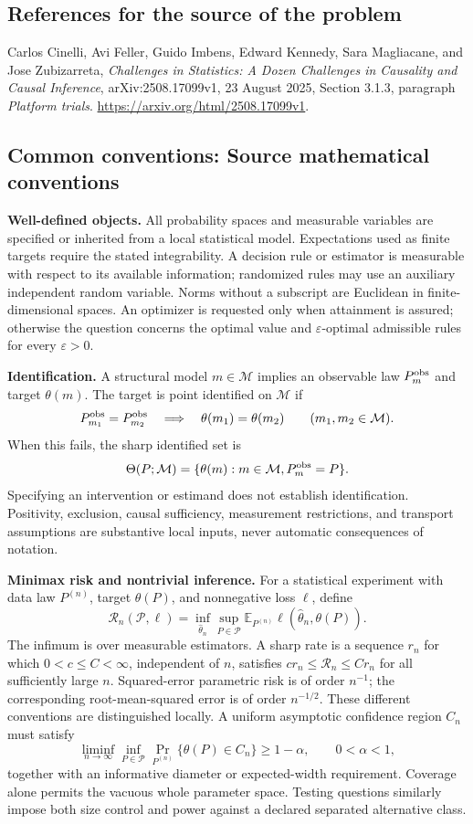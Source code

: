 \documentclass[11pt,a4paper]{article}
\newcommand{\E}{\mathbb E}
\begin{document}
\subsection*{References for the source of the problem}
Carlos Cinelli, Avi Feller, Guido Imbens, Edward Kennedy, Sara Magliacane, and Jose Zubizarreta, \emph{Challenges in Statistics: A Dozen Challenges in Causality and Causal Inference}, arXiv:2508.17099v1, 23 August 2025, Section 3.1.3, paragraph \emph{Platform trials}. \url{https://arxiv.org/html/2508.17099v1}.

\subsection*{Common conventions: Source mathematical conventions}

\textbf{Well-defined objects.}
All probability spaces and measurable variables are specified or inherited
from a local statistical model. Expectations used as finite targets require
the stated integrability. A decision rule or estimator is measurable with
respect to its available information; randomized rules may use an auxiliary
independent random variable. Norms without a subscript are Euclidean in
finite-dimensional spaces. An optimizer is requested only when attainment
is assured; otherwise the question concerns the optimal value and
$\varepsilon$-optimal admissible rules for every $\varepsilon>0$.

\textbf{Identification.}
A structural model $m\in\mathcal M$ implies an observable law
$P_m^{\rm obs}$ and target $\theta(m)$. The target is point identified on
$\mathcal M$ if
\[
 P_{m_1}^{\rm obs}=P_{m_2}^{\rm obs}
 \quad\Longrightarrow\quad\theta(m_1)=\theta(m_2)
 \qquad(m_1,m_2\in\mathcal M).
\]
When this fails, the sharp identified set is
\[
 \Theta(P;\mathcal M)=\{\theta(m):m\in\mathcal M,
                                  P_m^{\rm obs}=P\}.
\]
Specifying an intervention or estimand does not establish identification.
Positivity, exclusion, causal sufficiency, measurement restrictions, and
transport assumptions are substantive local inputs, never automatic
consequences of notation.

\textbf{Minimax risk and nontrivial inference.}
For a statistical experiment with data law $P^{(n)}$, target $\theta(P)$,
and nonnegative loss $\ell$, define
\[
 \mathcal R_n(\mathcal P,\ell)
   =\inf_{\widehat\theta_n}\sup_{P\in\mathcal P}
      \E_{P^{(n)}}\ell(\widehat\theta_n,\theta(P)).
\]
The infimum is over measurable estimators. A sharp rate is a sequence
$r_n$ for which $0<c\leq C<\infty$, independent of $n$, satisfies
$c r_n\leq\mathcal R_n\leq C r_n$ for all sufficiently large $n$.
Squared-error parametric risk is of order $n^{-1}$; the corresponding
root-mean-squared error is of order $n^{-1/2}$. These different conventions
are distinguished locally. A uniform asymptotic confidence region $C_n$
must satisfy
\[
 \liminf_{n\to\infty}\inf_{P\in\mathcal P}
     \Pr_{P^{(n)}}\{\theta(P)\in C_n\}\geq 1-\alpha,
 \qquad 0<\alpha<1,
\]
together with an informative diameter or expected-width requirement.
Coverage alone permits the vacuous whole parameter space. Testing questions
similarly impose both size control and power against a declared separated
alternative class.
\end{document}
